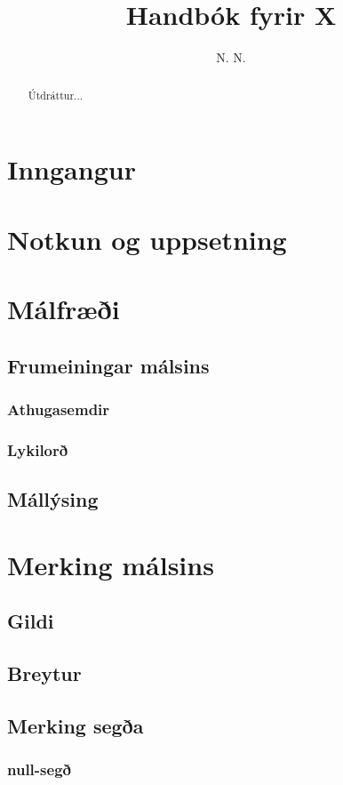 \documentclass[12pt,a4paper]{article}
\begin{document}
\sloppy
\title{Handbók fyrir X}
\author{N. N.}
\maketitle

\begin{abstract}
Útdráttur...
\end{abstract}

\tableofcontents

\section{Inngangur}
\section{Notkun og uppsetning}
\section{Málfræði}
\subsection{Frumeiningar málsins}
\subsubsection{Athugasemdir}
\subsubsection{Lykilorð}
\subsection{Mállýsing}
\section{Merking málsins}
\subsection{Gildi}
\subsection{Breytur}
\subsection{Merking segða}
\subsubsection{null-segð}
\end{document}
